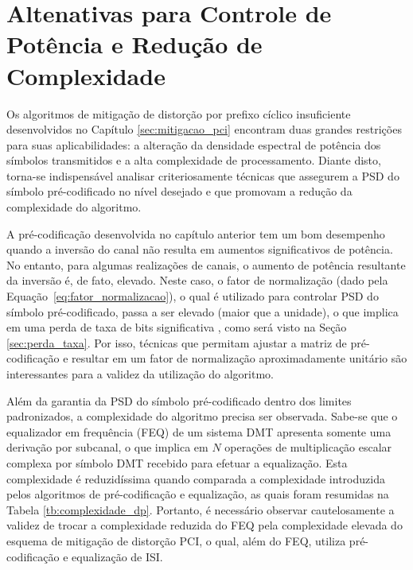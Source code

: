 \chapter{Altenativas para Controle de Potência e Redução de Complexidade}
\label{sec:power_control}

Os algoritmos de mitigação de distorção por prefixo cíclico insuficiente desenvolvidos no Capítulo \ref{sec:mitigacao_pci} encontram duas grandes restrições para suas aplicabilidades: a alteração da densidade espectral de potência dos símbolos transmitidos e a alta complexidade de processamento. Diante disto, torna-se indispensável analisar criteriosamente técnicas que assegurem a PSD do símbolo pré-codificado no nível desejado e que promovam a redução da complexidade do algoritmo.

A pré-codificação desenvolvida no capítulo anterior tem um bom desempenho quando a inversão do canal não resulta em aumentos significativos de potência. No entanto, para algumas realizações de canais, o aumento de potência resultante da inversão é, de fato, elevado. Neste caso, o fator de normalização (dado pela Equação~\ref{eq:fator_normalizacao}), o qual é utilizado para controlar PSD do símbolo pré-codificado, passa a ser elevado (maior que a unidade), o que implica em uma perda de taxa de bits significativa \cite{malkin2009}, como será visto na Seção \ref{sec:perda_taxa}. Por isso, técnicas que permitam ajustar a matriz de pré-codificação e resultar em um fator de normalização aproximadamente unitário são interessantes para a validez da utilização do algoritmo.

Além da garantia da PSD do símbolo pré-codificado dentro dos limites padronizados, a complexidade do algoritmo precisa ser observada. Sabe-se que o equalizador em frequência (FEQ) de um sistema DMT apresenta somente uma derivação por subcanal, o que implica em $N$ operações de multiplicação escalar complexa por símbolo DMT recebido para efetuar a equalização. Esta complexidade é reduzidíssima quando comparada a complexidade introduzida pelos algoritmos de pré-codificação e equalização, as quais foram resumidas na Tabela \ref{tb:complexidade_dp}. Portanto, é necessário observar cautelosamente a validez de trocar a complexidade reduzida do FEQ pela complexidade elevada do esquema de mitigação de distorção PCI, o qual, além do FEQ, utiliza pré-codificação e equalização de ISI.

